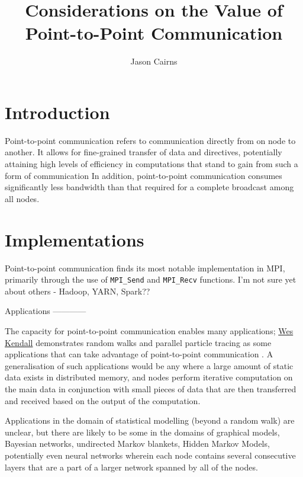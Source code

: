 \documentclass[a4paper,10pt]{article}
\begin{document}
\title{Considerations on the Value of Point-to-Point Communication}
\author{Jason Cairns}
  
\maketitle

\section{Introduction}

Point-to-point communication refers to communication directly from on node to
another.
It allows for fine-grained transfer of data and directives, potentially
attaining high levels of efficiency in computations that stand to gain from
such a form of communication
In addition, point-to-point communication consumes significantly less bandwidth
than that required for a complete broadcast among all nodes.

\section{Implementations}

Point-to-point communication finds its most notable implementation in MPI,
primarily through the use of \texttt{MPI\_Send} and \texttt{MPI\_Recv}
functions.
I'm not sure yet about others - Hadoop, YARN, Spark??

Applications
------------

The capacity for point-to-point communication enables many applications;
\href{https://mpitutorial.com/tutorials/point-to-point-communication-application-random-walk}{Wes
Kendall} demonstrates random walks and parallel particle tracing as some
applications that can take advantage of point-to-point communication
\cite{kendall2014mpi}.
A generalisation of such applications would be any where a large amount of
static data exists in distributed memory, and nodes perform iterative
computation on the main data in conjunction with small pieces of data that are
then transferred and received based on the output of the computation.

Applications in the domain of statistical modelling (beyond a random walk) are
unclear, but there are likely to be some in the domains of graphical models,
Bayesian networks, undirected Markov blankets, Hidden Markov Models,
potentially even neural networks wherein each node contains several consecutive
layers that are a part of a larger network spanned by all of the nodes.
\end{document}
